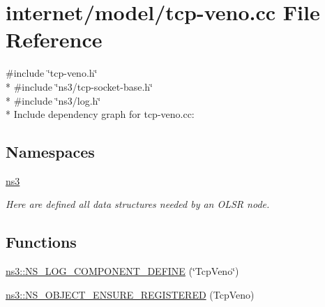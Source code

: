 \hypertarget{tcp-veno_8cc}{}\section{internet/model/tcp-\/veno.cc File Reference}
\label{tcp-veno_8cc}
{\ttfamily \#include \char`\"{}tcp-\/veno.\+h\char`\"{}}\\*
{\ttfamily \#include \char`\"{}ns3/tcp-\/socket-\/base.\+h\char`\"{}}\\*
{\ttfamily \#include \char`\"{}ns3/log.\+h\char`\"{}}\\*
Include dependency graph for tcp-\/veno.cc\+:
\subsection*{Namespaces}
\begin{DoxyCompactItemize}
\item 
 \hyperlink{namespacens3}{ns3}
\begin{DoxyCompactList}\small\item\em Here are defined all data structures needed by an O\+L\+SR node. \end{DoxyCompactList}\end{DoxyCompactItemize}
\subsection*{Functions}
\begin{DoxyCompactItemize}
\item 
\hyperlink{namespacens3_a71bb3f131d6b5b4ed2d2d9221ac25d98}{ns3\+::\+N\+S\+\_\+\+L\+O\+G\+\_\+\+C\+O\+M\+P\+O\+N\+E\+N\+T\+\_\+\+D\+E\+F\+I\+NE} (\char`\"{}Tcp\+Veno\char`\"{})
\item 
\hyperlink{namespacens3_a1b5a62d3797a6f480a05f98c3ef41c25}{ns3\+::\+N\+S\+\_\+\+O\+B\+J\+E\+C\+T\+\_\+\+E\+N\+S\+U\+R\+E\+\_\+\+R\+E\+G\+I\+S\+T\+E\+R\+ED} (Tcp\+Veno)
\end{DoxyCompactItemize}
